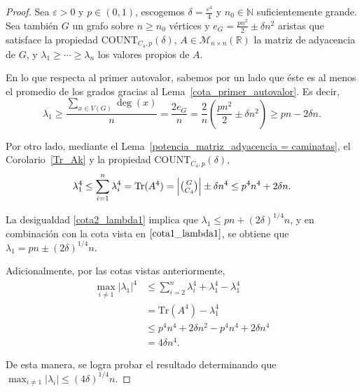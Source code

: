 \documentclass{article}[14pts]
\newcommand{\Count}{\mathrm{COUNT}}
\newcommand{\Tr}{\mathrm{Tr}}
\let\varepsilon=\varepsilon
\begin{document}
\begin{proof}
    Sea $\varepsilon > 0$ y $p\in (0,1)$, escogemos $\delta = \frac{\varepsilon^{4}}{4}$ y $n_0\in\mathbb{N}$ suficientemente grande. Sea también $G$ un grafo sobre $n\geq n_0$ vértices y $e_G = \frac{pn^{2}}{2} \pm \delta n^{2}$ aristas que satisface la propiedad $\Count_{C_4, p}(\delta)$, $A\in\mathcal{M}_{n\times n}(\mathbb{R})$ la matriz de adyacencia de $G$, y $\lambda_1 \geq \cdots \geq \lambda_n$ los valores propios de $A$.

    En lo que respecta al primer autovalor, sabemos por un lado que éste es al menos el promedio de los grados gracias al Lema~\ref{cota_primer_autovalor}. Es decir,
    \begin{equation} \label{cota1_lambda1}
        \lambda_1 \geq \frac{\sum_{x\in V(G)}\deg(x)}{n} = \frac{2e_G}{n} = \frac{2}{n}\left( \frac{pn^{2}}{2} \pm \delta n^{2}\right) \geq pn - 2\delta n.
    \end{equation}

    Por otro lado, mediante el Lema~\ref{potencia_matriz_adyacencia = caminatas}, el Corolario~\ref{Tr_Ak} y la propiedad $\Count_{C_4,p}(\delta)$,
    \begin{equation} \label{cota2_lambda1}
        \lambda_{1}^{4} \leq \sum_{i = 1}^{n}\lambda_{i}^{4} = \Tr(A^{4}) = \left| \tbinom{G}{C_4}\right| \pm \delta n^{4} \leq p^{4}n^{4} + 2\delta n.
    \end{equation}

    La desigualdad \eqref{cota2_lambda1} implica que $\lambda_1 \leq pn + (2\delta)^{1/4} n$, y en combinación con la cota vista en $\eqref{cota1_lambda1}$, se obtiene que $\lambda_1 = pn \pm (2\delta)^{1/4} n$.\medskip

    Adicionalmente, por las cotas vistas anteriormente,
    \begin{align*}
        \max_{i\not= 1} |\lambda_1|^{4} &\leq \sum_{i = 2}^{n} \lambda_{i}^{4} + \lambda_1^{4} - \lambda_1^{4} \\
        &= \Tr(A^{4}) - \lambda_{1}^{4}\\
        &\leq p^{4}n^{4}  + 2\delta n^{2} - p^{4}n^{4} + 2\delta n^{4}\\
        &= 4\delta n^{4}.
    \end{align*}

    De esta manera, se logra probar el resultado determinando que $\displaystyle\max_{i \not= 1}|\lambda_i| \leq (4\delta)^{1/4}n$. 
\end{proof}\medskip
\end{document}
